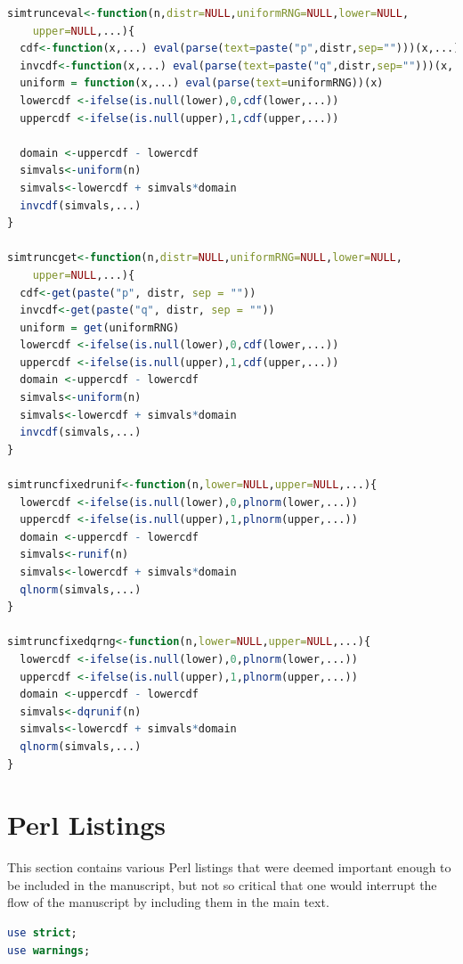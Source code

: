 \documentclass[10pt]{article}
\begin{document}
\begin{appendices}
\begin{lstlisting}[language=R,frame=single,caption={Non - OO implementations of truncated random number simulation in R},label={lst:RNGCodeInR},captionpos=b]
simtrunceval<-function(n,distr=NULL,uniformRNG=NULL,lower=NULL,
    upper=NULL,...){
  cdf<-function(x,...) eval(parse(text=paste("p",distr,sep="")))(x,...)
  invcdf<-function(x,...) eval(parse(text=paste("q",distr,sep="")))(x,...)
  uniform = function(x,...) eval(parse(text=uniformRNG))(x)
  lowercdf <-ifelse(is.null(lower),0,cdf(lower,...))
  uppercdf <-ifelse(is.null(upper),1,cdf(upper,...))

  domain <-uppercdf - lowercdf
  simvals<-uniform(n)
  simvals<-lowercdf + simvals*domain
  invcdf(simvals,...)
}

simtruncget<-function(n,distr=NULL,uniformRNG=NULL,lower=NULL,
    upper=NULL,...){
  cdf<-get(paste("p", distr, sep = ""))
  invcdf<-get(paste("q", distr, sep = ""))
  uniform = get(uniformRNG)
  lowercdf <-ifelse(is.null(lower),0,cdf(lower,...))
  uppercdf <-ifelse(is.null(upper),1,cdf(upper,...))
  domain <-uppercdf - lowercdf
  simvals<-uniform(n)
  simvals<-lowercdf + simvals*domain
  invcdf(simvals,...)
}

simtruncfixedrunif<-function(n,lower=NULL,upper=NULL,...){
  lowercdf <-ifelse(is.null(lower),0,plnorm(lower,...))
  uppercdf <-ifelse(is.null(upper),1,plnorm(upper,...))
  domain <-uppercdf - lowercdf
  simvals<-runif(n)
  simvals<-lowercdf + simvals*domain
  qlnorm(simvals,...)
}

simtruncfixedqrng<-function(n,lower=NULL,upper=NULL,...){
  lowercdf <-ifelse(is.null(lower),0,plnorm(lower,...))
  uppercdf <-ifelse(is.null(upper),1,plnorm(upper,...))
  domain <-uppercdf - lowercdf
  simvals<-dqrunif(n)
  simvals<-lowercdf + simvals*domain
  qlnorm(simvals,...)
}
\end{lstlisting}

\newpage

\section{Perl Listings}
This section contains various Perl listings that were deemed important enough to be included in the manuscript, but not so critical that one would interrupt the flow of the manuscript by including them in the main text. 
\begin{lstlisting}[language=Perl,basicstyle=\footnotesize,frame=single,caption={An API for the Inverse CDF method.},label={lst:RNGSimulator},captionpos=b]
use strict;
use warnings;


\end{lstlisting}
\end{appendices}
\end{document}
